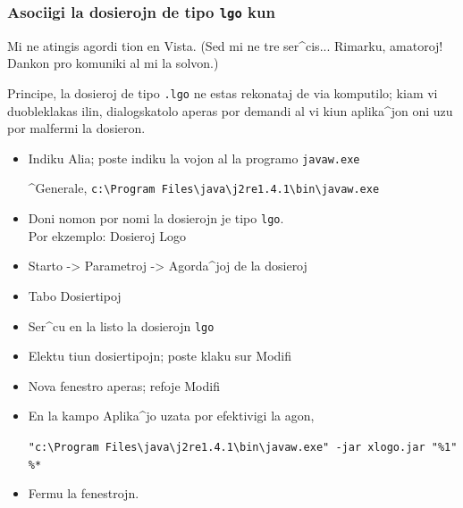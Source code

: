 \subsubsection*{Asociigi la dosierojn de tipo \texttt{lgo} kun \xlogo}
Mi ne atingis agordi tion en Vista.  (Sed mi ne tre ser^cis...
Rimarku, amatoroj!  Dankon pro komuniki al mi la solvon.)

Principe, la dosieroj de tipo \texttt{.lgo} ne estas rekonataj de via
komputilo; kiam vi duobleklakas ilin, dialogskatolo aperas por demandi
al vi kiun aplika^jon oni uzu por malfermi la dosieron.
\begin{itemize}
\item Indiku \og Alia\fg; poste indiku la vojon al la programo
  \texttt{javaw.exe}
\begin{center}
^Generale, \texttt{c:\textbackslash Program Files\textbackslash java\textbackslash j2re1.4.1\textbackslash bin\textbackslash javaw.exe}
\end{center}
\item Doni nomon por nomi la dosierojn je tipo \texttt{lgo}.\\
Por ekzemplo: Dosieroj Logo
\item Starto -> Parametroj -> Agorda^joj de la dosieroj
\item Tabo \og Dosiertipoj \fg
\item Ser^cu en la listo la dosierojn \texttt{lgo}
\item Elektu tiun dosiertipojn; poste klaku sur \og Modifi\fg
\item Nova fenestro aperas; refoje \og Modifi\fg
\item En la kampo \og Aplika^jo uzata por efektivigi la agon\fg,
\begin{center}
\texttt{"c:\textbackslash Program Files\textbackslash java\textbackslash j2re1.4.1\textbackslash bin\textbackslash javaw.exe" -jar xlogo.jar "\%1" \%*}
\end{center} 
\item Fermu la fenestrojn.
\end{itemize}
